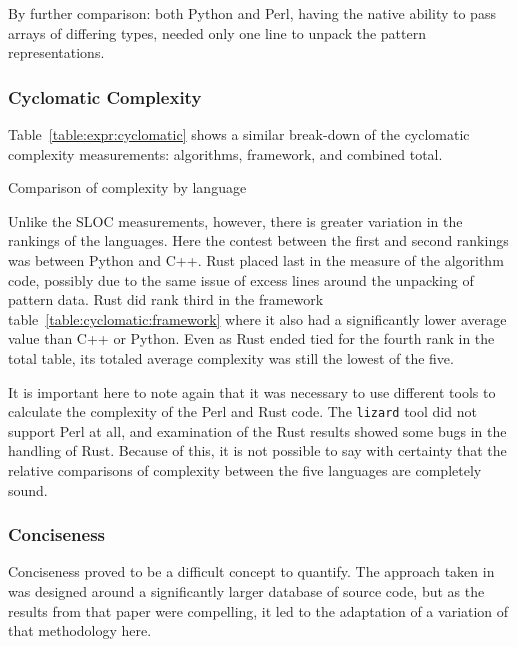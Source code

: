 By further comparison: both Python and Perl, having the native ability to pass arrays of differing types, needed only one line to unpack the pattern representations.

\subsubsection{Cyclomatic Complexity}
\label{subsubsec:complexity}

Table~\ref{table:expr:cyclomatic} shows a similar break-down of the cyclomatic complexity measurements: algorithms, framework, and combined total.

\begin{table}[!htb]

\caption{Comparison of complexity by language}
\label{table:expr:cyclomatic}
\end{table}

Unlike the SLOC measurements, however, there is greater variation in the rankings of the languages. Here the contest between the first and second rankings was between Python and C++. Rust placed last in the measure of the algorithm code, possibly due to the same issue of excess lines around the unpacking of pattern data. Rust did rank third in the framework table~\ref{table:cyclomatic:framework} where it also had a significantly lower average value than C++ or Python. Even as Rust ended tied for the fourth rank in the total table, its totaled average complexity was still the lowest of the five.

It is important here to note again that it was necessary to use different tools to calculate the complexity of the Perl and Rust code. The \texttt{lizard} tool did not support Perl at all, and examination of the Rust results showed some bugs in the handling of Rust. Because of this, it is not possible to say with certainty that the relative comparisons of complexity between the five languages are completely sound.

\subsubsection{Conciseness}
\label{subsubsec:conciseness}

Conciseness proved to be a difficult concept to quantify. The approach taken in~\cite{bergmans} was designed around a significantly larger database of source code, but as the results from that paper were compelling, it led to the adaptation of a variation of that methodology here.

